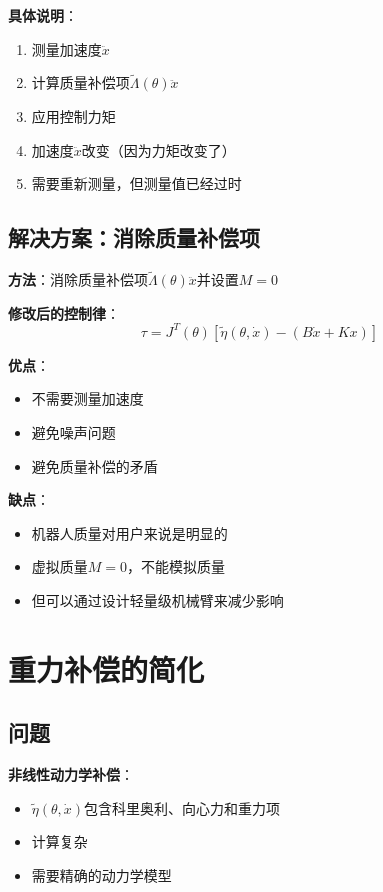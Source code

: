 \documentclass[12pt,a4paper]{article}
\begin{document}
\textbf{具体说明}：
\begin{enumerate}
\item 测量加速度$\ddot{x}$
\item 计算质量补偿项$\tilde{\Lambda}(\theta)\ddot{x}$
\item 应用控制力矩
\item 加速度$\ddot{x}$改变（因为力矩改变了）
\item 需要重新测量，但测量值已经过时
\end{enumerate}

\subsection{解决方案：消除质量补偿项}

\textbf{方法}：消除质量补偿项$\tilde{\Lambda}(\theta)\ddot{x}$并设置$M = 0$

\textbf{修改后的控制律}：
\begin{equation}
\tau = J^T(\theta)\left[\tilde{\eta}(\theta, \dot{x}) - (B\dot{x} + Kx)\right]
\end{equation}

\textbf{优点}：
\begin{itemize}
\item 不需要测量加速度
\item 避免噪声问题
\item 避免质量补偿的矛盾
\end{itemize}

\textbf{缺点}：
\begin{itemize}
\item 机器人质量对用户来说是明显的
\item 虚拟质量$M = 0$，不能模拟质量
\item 但可以通过设计轻量级机械臂来减少影响
\end{itemize}

\section{重力补偿的简化}

\subsection{问题}

\textbf{非线性动力学补偿}：
\begin{itemize}
\item $\tilde{\eta}(\theta, \dot{x})$包含科里奥利、向心力和重力项
\item 计算复杂
\item 需要精确的动力学模型
\end{itemize}
\end{document}
